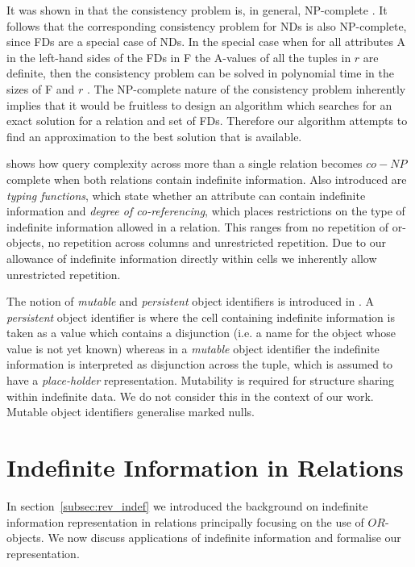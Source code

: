 It was shown in \cite{vn95} that the consistency problem is,
in general, NP-complete \cite{gj79}.  It follows that the 
corresponding consistency problem for NDs is also
NP-complete, since FDs are a special case of NDs.
In the special case when for all attributes A in the left-hand sides 
of the FDs in F the A-values of all the tuples in $r$ are definite,
then the consistency problem can be solved in polynomial time
in the sizes of F and $r$ \cite{vn95}.
The NP-complete nature of the consistency problem inherently
implies that it would be fruitless to design an algorithm which
searches for an exact solution for a relation and set of FDs. Therefore
our algorithm attempts to find an approximation to the best
solution that is available.

\cite{ivv95} shows how query complexity across more
than a single relation becomes
$co-NP$ complete when both relations contain indefinite information. Also 
introduced are {\em typing functions}, which state whether an
attribute can contain indefinite information and {\em degree of 
co-referencing}, which places restrictions on
the type of indefinite information allowed in a relation. This ranges
from no repetition of or-objects, no repetition across columns and
unrestricted repetition. Due to our allowance of indefinite
information directly within cells we inherently allow unrestricted repetition.
\medskip

The notion of {\em mutable} and {\em persistent} object identifiers is
introduced in \cite{inv91}. A {\em persistent} object identifier is where the cell
containing indefinite information is taken as a value which contains a
disjunction (i.e. a name for the object whose value is not yet known)
 whereas in a {\em mutable} object identifier the indefinite
information is interpreted as disjunction across the tuple, which
is assumed to have a {\em place-holder } representation.
Mutability is required for structure sharing within indefinite data.
We do not consider this in the context of our work. Mutable object
identifiers generalise marked nulls. 


\section{Indefinite Information in Relations}\label{sec:intro}

In section~\ref{subsec:rev_indef} we introduced the background on
indefinite information representation in relations principally
focusing on the use of $OR$-objects. We now discuss applications of
indefinite information and formalise our representation.

